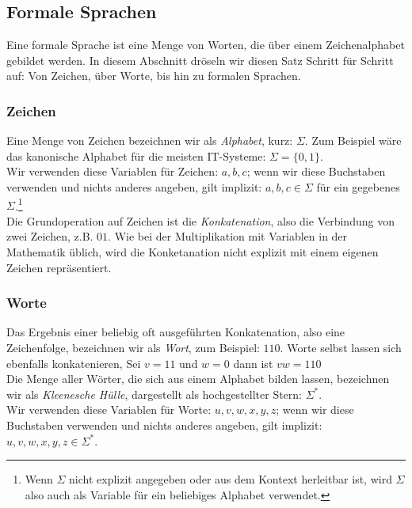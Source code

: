 \subsection{Formale Sprachen}\label{subsec:formaleSprachen}

Eine formale Sprache ist eine Menge von Worten,
die über einem Zeichenalphabet gebildet werden.
In diesem Abschnitt dröseln wir diesen Satz Schritt für Schritt auf:
Von Zeichen, über Worte, bis hin zu formalen Sprachen.

\subsubsection{Zeichen}

Eine Menge von Zeichen bezeichnen wir als \emph{Alphabet}, kurz: $\Sigma$.
Zum Beispiel wäre das kanonische Alphabet für die meisten IT-Systeme: $\Sigma = \{0,1\}$.\\

\noindent
Wir verwenden diese Variablen für Zeichen: $a,b,c$;
wenn wir diese Buchstaben verwenden und nichts anderes angeben,
gilt implizit: $a, b, c \in \Sigma$ für ein gegebenes $\Sigma$.\footnote{
Wenn $\Sigma$ nicht explizit angegeben oder aus dem Kontext herleitbar ist,
wird $\Sigma$ also auch als Variable für ein beliebiges Alphabet verwendet.}\\

\noindent
Die Grundoperation auf Zeichen ist die \emph{Konkatenation},
also die Verbindung von zwei Zeichen, z.B. $01$.
Wie bei der Multiplikation mit Variablen in der Mathematik üblich,
wird die Konketanation nicht explizit mit einem eigenen Zeichen repräsentiert.

\subsubsection{Worte}\label{words}
Das Ergebnis einer beliebig oft ausgeführten Konkatenation,
also eine Zeichenfolge,
bezeichnen wir als \emph{Wort}, zum Beispiel: $110$.
Worte selbst lassen sich ebenfalls konkatenieren,
Sei $v = 11$ und $w = 0$ dann ist $vw = 110$\\

\noindent
Die Menge aller Wörter,
die sich aus einem Alphabet bilden lassen,
bezeichnen wir als \emph{Kleenesche Hülle}, dargestellt als hochgestellter Stern: $\Sigma^*$.\\

\noindent
Wir verwenden diese Variablen für Worte:
$u, v, w, x, y, z$; wenn wir diese Buchstaben verwenden und nichts anderes angeben,
gilt implizit: $u, v, w, x, y, z \in \Sigma^*$.\\

